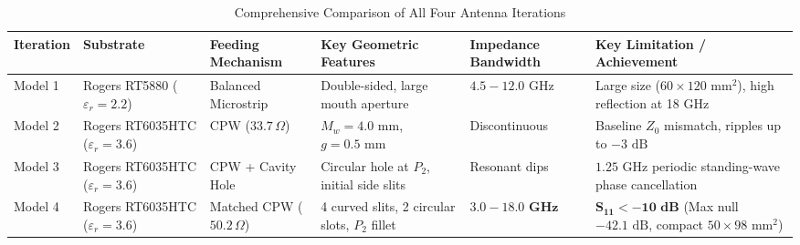 \documentclass[journal,compsoc,twocolumn,10pt]{IEEEtran}
\begin{document}
\begin{table}[htbp]
\caption{Comprehensive Comparison of All Four Antenna Iterations}
\label{tab:comparison_all}
\centering
\begin{tabularx}{\textwidth}{@{}l p{2.8cm} p{2.2cm} X p{2.3cm} X@{}}
\toprule
\textbf{Iteration} & \textbf{Substrate} & \textbf{Feeding Mechanism} & \textbf{Key Geometric Features} & \textbf{Impedance Bandwidth} & \textbf{Key Limitation / Achievement} \\ \midrule
Model 1 & Rogers RT5880 ($\varepsilon_r=2.2$) & Balanced Microstrip & Double-sided, large mouth aperture & $4.5 - 12.0\text{ GHz}$ & Large size ($60 \times 120\text{ mm}^2$), high reflection at 18 GHz \\ \addlinespace
Model 2 & Rogers RT6035HTC ($\varepsilon_r=3.6$) & CPW ($33.7\,\Omega$) & $M_w=4.0\text{ mm}$, $g=0.5\text{ mm}$ & Discontinuous & Baseline $Z_0$ mismatch, ripples up to $-3\text{ dB}$ \\ \addlinespace
Model 3 & Rogers RT6035HTC ($\varepsilon_r=3.6$) & CPW + Cavity Hole & Circular hole at $P_2$, initial side slits & Resonant dips & $1.25\text{ GHz}$ periodic standing-wave phase cancellation \\ \addlinespace
Model 4 & Rogers RT6035HTC ($\varepsilon_r=3.6$) & Matched CPW ($50.2\,\Omega$) & 4 curved slits, 2 circular slots, $P_2$ fillet & $\mathbf{3.0 - 18.0\text{ GHz}}$ & $\mathbf{S_{11} < -10\text{ dB}}$ (Max null $-42.1\text{ dB}$, compact $50 \times 98\text{ mm}^2$) \\ \bottomrule
\end{tabularx}
\end{table}

\end{document}
